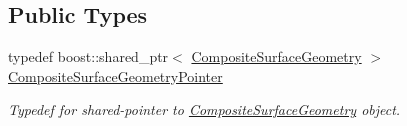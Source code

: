 \subsection*{Public Types}
\begin{DoxyCompactItemize}
\item 
typedef boost\+::shared\+\_\+ptr$<$ \hyperlink{classtudat_1_1geometric__shapes_1_1CompositeSurfaceGeometry}{Composite\+Surface\+Geometry} $>$ \hyperlink{classtudat_1_1geometric__shapes_1_1CompositeSurfaceGeometry_aea778d4252cf5812c10f4ce0b84f7f6e}{Composite\+Surface\+Geometry\+Pointer}\hypertarget{classtudat_1_1geometric__shapes_1_1CompositeSurfaceGeometry_aea778d4252cf5812c10f4ce0b84f7f6e}{}\label{classtudat_1_1geometric__shapes_1_1CompositeSurfaceGeometry_aea778d4252cf5812c10f4ce0b84f7f6e}

\begin{DoxyCompactList}\small\item\em Typedef for shared-\/pointer to \hyperlink{classtudat_1_1geometric__shapes_1_1CompositeSurfaceGeometry}{Composite\+Surface\+Geometry} object. \end{DoxyCompactList}\end{DoxyCompactItemize}

